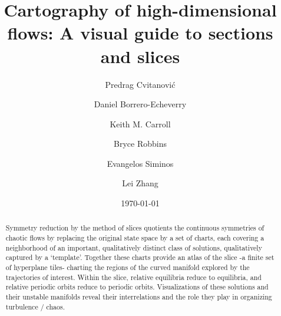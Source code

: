 \documentclass[aip,cha,reprint,
secnumarabic,
nofootinbib, tightenlines,
nobibnotes, showkeys, showpacs,
groupedaddress
]{revtex4-1}
\begin{document}
\title[High-dimensional cartography]
{Cartography of high-dimensional flows: A visual guide to sections and slices}


\author{Predrag Cvitanovi{\'c}}
\author{Daniel Borrero-Echeverry}
\author{Keith M. Carroll}
\author{Bryce Robbins}
\author{Evangelos Siminos}
\author{Lei Zhang}

\date{\today}

    \begin{abstract}
Symmetry reduction by the method of slices quotients the continuous
symmetries of chaotic flows by replacing the original state space by a
set of charts, each covering a neighborhood of an important,
qualitatively distinct class of solutions, qualitatively captured by a
`template'. Together these charts provide an atlas of the slice -a finite
set of hyperplane tiles- charting the regions of the curved manifold
explored by the trajectories of interest. Within the slice, relative
equilibria reduce to equilibria, and relative periodic orbits reduce to
periodic orbits. Visualizations of these solutions and their unstable
manifolds reveal their interrelations and the role they play in
organizing turbulence / chaos.
    \end{abstract}


\maketitle
\end{document}
